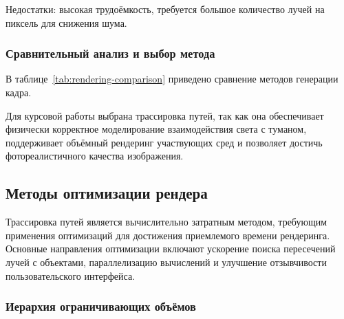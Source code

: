 Недостатки: высокая трудоёмкость, требуется большое количество лучей на пиксель для снижения шума.

\subsubsection{Сравнительный анализ и выбор метода}

В таблице~\ref{tab:rendering-comparison} приведено сравнение методов генерации кадра.

\begin{table}[H]
\captionsetup{justification=raggedleft,singlelinecheck=false}
\caption{Сравнение методов рендеринга}
\label{tab:rendering-comparison}
\end{table}

Для курсовой работы выбрана трассировка путей, так как она обеспечивает физически корректное моделирование взаимодействия света с туманом,
поддерживает объёмный рендеринг участвующих сред и позволяет достичь фотореалистичного качества изображения.


\subsection{Методы оптимизации рендера}

Трассировка путей является вычислительно затратным методом, требующим применения оптимизаций для достижения приемлемого времени рендеринга.
Основные направления оптимизации включают ускорение поиска пересечений лучей с объектами, параллелизацию вычислений и улучшение отзывчивости пользовательского интерфейса.

\subsubsection{Иерархия ограничивающих объёмов}

